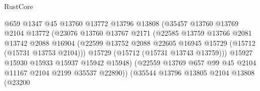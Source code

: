 \begin{lexlean}{RustCore}
\begin{coremodule}
                                    @659
                                    @1347
                                    @45
                                    @13760
                                    @13772
                                    @13796
                                    @13808
                                    (@35457
                                      @13760
                                      @13769
                                      @2104
                                      @13772
                                      (@23076
                                        @13760
                                        @13767
                                        @2171
                                        (@22585
                                          @13759
                                          @13766
                                          @2081
                                          @13742
                                          @2088
                                          @16904
                                          (@22599
                                            @13752
                                            @2088
                                            @22605
                                            @16945
                                            @15729
                                            (@15712 (@15731 @13753 @2104)))
                                          @15729
                                          (@15712 (@15731 @13743 @13759)))
                                        @15927
                                        @15930
                                        @15933
                                        @15937
                                        @15942
                                        @15948)
                                      (@22559
                                        @13769
                                        @657
                                        @99
                                        @45
                                        @2104
                                        @11167
                                        @2104
                                        @2199
                                        @35537
                                        @22890))
                                    (@35544
                                      @13796
                                      @13805
                                      @2104
                                      @13808
                                      (@23200

\end{coremodule}
\end{lexlean}
